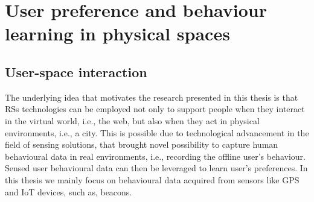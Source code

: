 \chapter{User preference and behaviour learning in physical spaces}
\label{cha:behaviour_learning}
\ifpdf
\graphicspath{{Chapter4/Figs/Raster/}{Chapter4/Figs/PDF/}{Chapter4/Figs/}}
\else
\graphicspath{{Chapter4/Figs/Vector/}{Chapter4/Figs/}}
\fi




\section{User-space interaction}
The underlying idea that motivates the research presented in this thesis is that RSs technologies can be employed not only to support people when they interact in the virtual world,
i.e., the web, but also when they act in physical environments, i.e., a city.
This is possible due to technological advancement in the field of sensing solutions, that brought novel possibility to capture human behavioural data in real environments, i.e., recording the offline user's behaviour. Sensed user behavioural data can then be leveraged to learn user's preferences. In this thesis we mainly focus on behavioural data acquired from sensors like GPS and IoT devices, such as, beacons.

